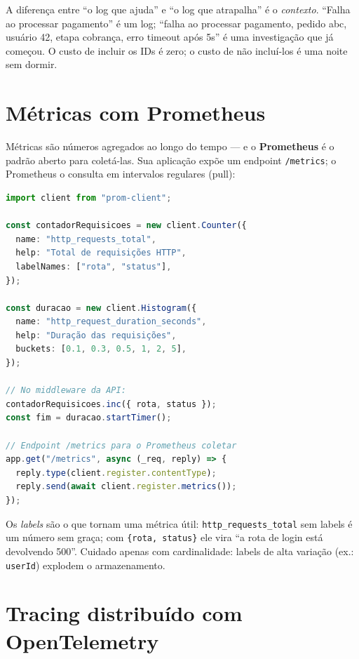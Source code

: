 \begin{caixaconceito}
A diferença entre ``o log que ajuda'' e ``o log que atrapalha'' é o
\emph{contexto}. ``Falha ao processar pagamento'' é um log; ``falha ao
processar pagamento, pedido abc, usuário 42, etapa cobrança, erro
timeout após 5s'' é uma investigação que já começou. O custo de incluir os
IDs é zero; o custo de não incluí-los é uma noite sem dormir.
\end{caixaconceito}

\section{Métricas com Prometheus}

Métricas são números agregados ao longo do tempo — e o \textbf{Prometheus} é
o padrão aberto para coletá-las. Sua aplicação expõe um endpoint
\texttt{/metrics}; o Prometheus o consulta em intervalos regulares (pull):

\begin{lstlisting}[style=livro, language=TypeScript,
  caption={Métricas RED com prom-client.}, label={list:obs-metricas}]
import client from "prom-client";

const contadorRequisicoes = new client.Counter({
  name: "http_requests_total",
  help: "Total de requisições HTTP",
  labelNames: ["rota", "status"],
});

const duracao = new client.Histogram({
  name: "http_request_duration_seconds",
  help: "Duração das requisições",
  buckets: [0.1, 0.3, 0.5, 1, 2, 5],
});

// No middleware da API:
contadorRequisicoes.inc({ rota, status });
const fim = duracao.startTimer();

// Endpoint /metrics para o Prometheus coletar
app.get("/metrics", async (_req, reply) => {
  reply.type(client.register.contentType);
  reply.send(await client.register.metrics());
});
\end{lstlisting}

\begin{caixadica}
Os \emph{labels} são o que tornam uma métrica útil: \texttt{http\_requests\_total}
sem labels é um número sem graça; com \texttt{\{rota, status\}} ele vira ``a
rota de login está devolvendo 500''. Cuidado apenas com cardinalidade:
labels de alta variação (ex.: \texttt{userId}) explodem o armazenamento.
\end{caixadica}

\section{Tracing distribuído com OpenTelemetry}

